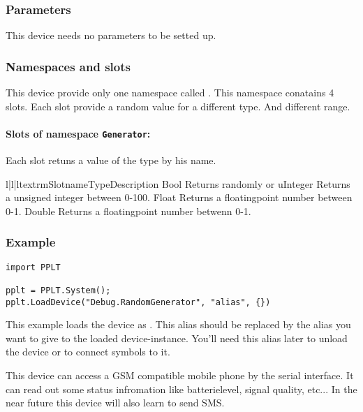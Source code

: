 \subsubsection{Parameters}
This device needs no parameters to be setted up. 

\subsubsection{Namespaces and slots}
This device provide only one namespace called . This namespace conatains
4 slots. Each slot provide a random value for a different type. And different range.

\paragraph{Slots of namespace \texttt{Generator}:}
Each slot retuns a value of the type by his name.
\begin{tableiii}{l|l|l}{textrm}{Slotname}{Type}{Description}
        {Bool}
        {Returns randomly  or }
        {uInteger}
        {Returns a unsigned integer between 0-100.}
        {Float}
        {Returns a floatingpoint number between 0-1.}
        {Double}
        {Returns a floatingpoint number betwenn 0-1.}
\end{tableiii}

\subsubsection{Example}
\begin{verbatim}
import PPLT

pplt = PPLT.System();
pplt.LoadDevice("Debug.RandomGenerator", "alias", {})
\end{verbatim}

This example loads the device as . This alias should be replaced by the alias you want to give to
the loaded device-instance. You'll need this alias later to unload the device or to connect symbols to it.









This device can access a GSM compatible mobile phone by the serial interface. It can read out
some status infromation  like batterielevel, signal quality, etc... In the near future this 
device will also learn to send SMS. 

